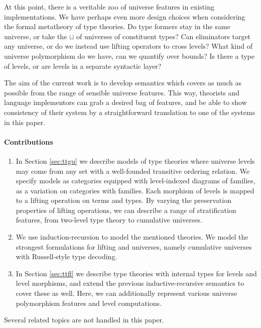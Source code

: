 \documentclass[a4paper,UKenglish,cleveref, autoref, thm-restate]{lipics-v2021}
\theoremstyle{remark}
\theoremstyle{definition}
\begin{document}
\noindent At this point, there is a veritable zoo of universe features in existing
implementations. We have perhaps even more design choices when considering the
formal metatheory of type theories. Do type formers stay in the same
universe, or take the $\sqcup$ of universes of constituent types? Can
eliminators target any universe, or do we instead use lifting operators to cross
levels? What kind of universe polymorphism do we have, can we quantify over
bounds? Is there a type of levels, or are levels in a separate syntactic layer?

The aim of the current work is to develop semantics which covers as much as
possible from the range of sensible universe features. This way, theorists and
language implementors can grab a desired bag of features, and be able to show
consistency of their system by a straightforward translation to one of the
systems in this paper.

\paragraph*{Contributions}

\begin{enumerate}
\item In Section \ref{sec:ttgu} we describe models of type theories where
  universe levels may come from any set with a well-founded transitive ordering
  relation. We specify models as categories equipped with level-indexed diagrams
  of families, as a variation on categories with families. Each morphism of
  levels is mapped to a lifting operation on terms and types. By varying the
  preservation properties of lifting operations, we can describe a range of
  stratification features, from two-level type theory to cumulative universes.
\item We use induction-recursion to model the mentioned theories. We model
  the strongest formulations for lifting and universes, namely cumulative
  universes with Russell-style type decoding.
\item In Section \ref{sec:ttfl} we describe type theories with internal types
  for levels and level morphisms, and extend the previous inductive-recursive
  semantics to cover these as well. Here, we can additionally represent various
  universe polymorphism features and level computations.
\end{enumerate}

\noindent Several related topics are not handled in this paper.
\end{document}

